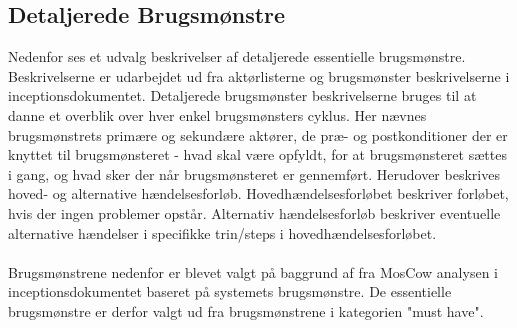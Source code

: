 \subsection{Detaljerede Brugsmønstre}
Nedenfor ses et udvalg beskrivelser af detaljerede essentielle brugsmønstre. 
Beskrivelserne er udarbejdet ud fra aktørlisterne og brugsmønster beskrivelserne i inceptionsdokumentet. Detaljerede brugsmønster beskrivelserne bruges til at danne et overblik over hver enkel brugsmønsters cyklus. Her nævnes brugsmønstrets primære og sekundære aktører, de præ- og postkonditioner der er knyttet til brugsmønsteret - hvad skal være opfyldt, for at brugsmønsteret sættes i gang, og hvad sker der når brugsmønsteret er gennemført. Herudover beskrives hoved- og alternative hændelsesforløb. Hovedhændelsesforløbet beskriver forløbet, hvis der ingen problemer opstår. Alternativ hændelsesforløb beskriver eventuelle alternative hændelser i specifikke trin/steps i hovedhændelsesforløbet. \\
\\
Brugsmønstrene nedenfor er blevet valgt på baggrund af fra MosCow analysen i inceptionsdokumentet baseret på systemets brugsmønstre. De essentielle brugsmønstre er derfor valgt ud fra brugsmønstrene i kategorien "must have".\\
\\ 
